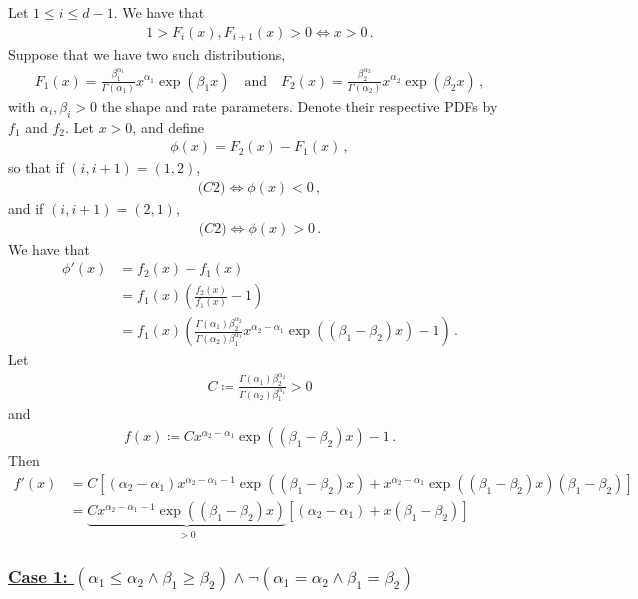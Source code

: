 \documentclass{article}
\begin{document}
%
Let $1 \leq i \leq d - 1$. We have that
%
\begin{align*}
	1 > F_i(x), F_{i+1}(x) > 0 \iff x > 0 \,.
\end{align*}
%
Suppose that we have two such distributions,
%
\begin{align*}
	F_1(x) = \frac{\beta^{\alpha_1}_1}{\Gamma(\alpha_1)} x ^ {\alpha_1}
	\exp(\beta_1 x) \quad \text{and} \quad
	F_2(x) = \frac{\beta^{\alpha_2}_2}{\Gamma(\alpha_2)} x ^ {\alpha_2}
	\exp(\beta_2 x) \,,
\end{align*}
%
with $\alpha_i, \beta_i > 0$ the shape and rate parameters.
Denote their respective PDFs by $f_1$ and $f_2$.
Let $x > 0$, and define
%
\begin{align*}
	\phi(x) = F_2(x) - F_1(x) \,,
\end{align*}
%
so that if $(i, i + 1) = (1, 2)$,
%
\begin{align*}
	\textit{(C2)} \iff \phi(x) < 0 \,,
\end{align*}
%
and if $(i, i + 1) = (2, 1)$,
%
\begin{align*}
	\textit{(C2)} \iff \phi(x) > 0 \,.
\end{align*}
%
We have that
%
\begin{align*}
	\phi'(x) &= f_2(x) - f_1(x)\\
	&= f_1(x) \left(\frac{f_2(x)}{f_1(x)} - 1\right)\\
	&= f_1(x) \left(\frac{\Gamma(\alpha_1)\beta ^ {\alpha_2}_2}
		{\Gamma(\alpha_2)\beta ^ {\alpha_1}_1} x^{\alpha_2 - \alpha_1}
		\exp((\beta_1 - \beta_2) x) - 1\right) \,.
\end{align*}
%
Let
%
\begin{align*}
	C \coloneqq \frac{\Gamma(\alpha_1) \beta ^ {\alpha_2}_2}
		{\Gamma(\alpha_2) \beta ^ {\alpha_1}_1} > 0
\end{align*}
%
and
%
\begin{align*}
	f(x) \coloneqq C x ^ {\alpha_2 - \alpha_1}
		\exp((\beta_1 - \beta_2) x) - 1 \,.
\end{align*}
%
Then
%
\begin{align*}
	f'(x) &= C\left[(\alpha_2 - \alpha_1) x ^ {\alpha_2 - \alpha_1 - 1}
		\exp((\beta_1 - \beta_2) x) + x ^ {\alpha_2 - \alpha_1}
		\exp((\beta_1 - \beta_2) x)(\beta_1 - \beta_2) \right]\\
	&=\underbrace{C x ^ {\alpha_2 - \alpha_1 - 1} \exp((\beta_1 - \beta_2) x)}
		_{ > 0} \left[(\alpha_2 - \alpha_1) + x (\beta_1 - \beta_2)\right]
\end{align*}
%
\subsubsection*{\underline{Case 1:
	$(\alpha_1 \leq \alpha_2 \land \beta_1 \geq \beta_2)
	\land \neg (\alpha_1 = \alpha_2 \land \beta_1 = \beta_2)$}}
%
\end{document}
